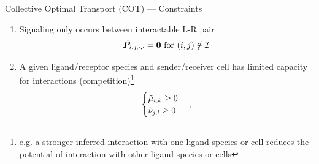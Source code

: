 \documentclass[10pt]{beamer}
\begin{document}
\begin{frame}{Collective Optimal Transport (COT)
--- Constraints}
    \begin{enumerate}
        \item Signaling only occurs between interactable L-R pair
        \begin{gather}
            \Tilde{\bm{P}}_{i,j,\cdot,\cdot}=\bm{0}~\text{for}~(i,j)\notin\mathcal{I}
        \end{gather}
        \item A given ligand/receptor species and sender/receiver cell has limited capacity for interactions (competition)\footnote{e.g. a stronger inferred interaction with one ligand species or cell reduces the potential of interaction with other ligand species or cells}
        \begin{gather}
            \begin{cases}
            \Tilde{\mu}_{i,k} \geq 0\\
            \Tilde{\nu}_{j,l} \geq 0
            \end{cases},
        \end{gather}
    \end{enumerate}
\end{frame}


\end{document}
